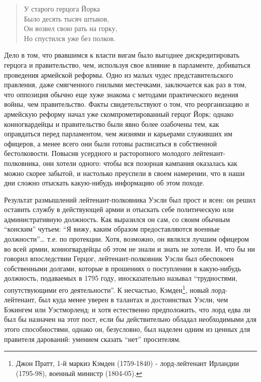\documentclass[
  oneside,
  12pt,
  titlepage]{book}
\begin{document}
\begin{quote}
У старого герцога Йорка\\
Было десять тысяч штыков,\\
Он возвел свою рать на горку,\\
Но спустился уже без полков.
\end{quote}

Дело в том, что рвавшимся к власти вигам было выгоднее дискредитировать герцога и правительство, чем, используя свое влияние в парламенте, добиваться проведения армейской реформы. Одно из малых чудес представительского правления, даже смягченного гнилыми местечками, заключается как раз в том, что оппозиция обычно еще хуже знакома с методами практического ведения войны, чем правительство. Факты свидетельствуют о том, что реорганизацию и армейскую реформу начал уже скомпрометированный герцог Йорк; однако конногвардейцы и правительство были явно более озабочены тем, как оправдаться перед парламентом, чем жизнями и карьерами служивших им офицеров, а менее всего они были готовы расписаться в собственной бестолковости. Повысив усердного и расторопного молодого лейтенант-полковника, они хотели одного: чтобы вся позорная кампания оказалась как можно скорее забытой, и настолько преуспели в своем намерении, что в наши дни сложно отыскать какую-нибудь информацию об этом походе.

Результат размышлений лейтенант-полковника Уэсли был прост и ясен: он решил оставить службу в действующей армии и отыскать себе политическую или административную должность. Как выразился он сам, со своим обычным ``конским'' чутьем: ``Я вижу, каким образом предоставляются военные должности''\ldots{} т.е. по протекции. Хотя, возможно, он являлся лучшим офицером во всей армии, конногвардейцы об этом не знали и знать не хотели. И, что бы ни говорил впоследствии Герцог, лейтенант-полковник Уэсли был обеспокоен собственными долгами, которые в прошениях о поступлении в какую-нибудь должность, подаваемых в 1795 году, иносказательно называл ``трудностями, сопутствующими его деятельности''. К несчастью, Кэмден\footnote{Джон Пратт, 1-й маркиз Кэмден (1759-1840) - лорд-лейтенант Ирландии (1795-98), военный министр (1804-05).}, новый лорд-лейтенант, был куда менее уверен в талантах и достоинствах Уэсли, чем Бэкингем или Уэстморленд; и хотя естественно предположить, что лорд едва ли был бы назначен на этот пост, если бы действительно обладал необходимыми для этого способностями, однако он, безусловно, был наделен одним из ценных для правителя дарований: умением сказать ``нет'' просителям.
\end{document}
